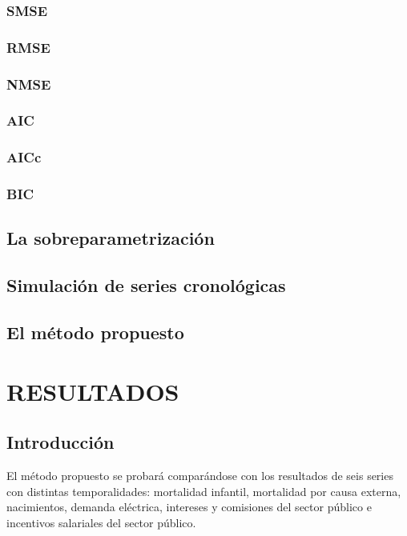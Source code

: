 \documentclass[
]{article}
\begin{document}
\subsubsection{SMSE}

\subsubsection{RMSE}

\subsubsection{NMSE}

\subsubsection{AIC}

\subsubsection{AICc}

\subsubsection{BIC}

\subsection{La sobreparametrización}

\subsection{Simulación de series cronológicas}

\subsection{El método propuesto}

\newpage

\section{RESULTADOS}

\subsection{Introducción}

El método propuesto se probará comparándose con los resultados de seis
series con distintas temporalidades: mortalidad infantil, mortalidad por
causa externa, nacimientos, demanda eléctrica, intereses y comisiones
del sector público e incentivos salariales del sector público.
\end{document}
